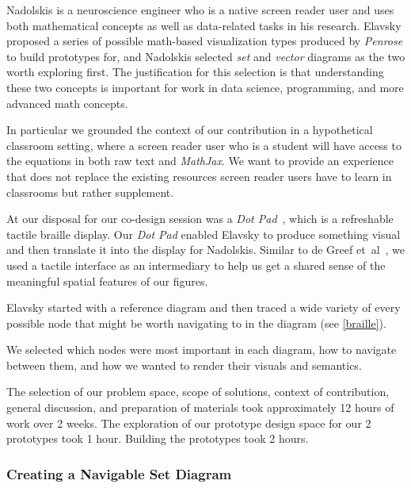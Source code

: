 \documentclass[journal]{vgtc}                %
\newcommand{\ea}{{et~al\xperiod}\xspace}
\begin{document}
Nadolskis is a neuroscience engineer who is a native screen reader user and uses both mathematical concepts as well as data-related tasks in his research. Elavsky proposed a series of possible math-based visualization types produced by \textit{Penrose} to build prototypes for, and Nadolskis selected \textit{set} and \textit{vector} diagrams as the two worth exploring first. The justification for this selection is that understanding these two concepts is important for work in data science, programming, and more advanced math concepts.

In particular we grounded the context of our contribution in a hypothetical classroom setting, where a screen reader user who is a student will have access to the equations in both raw text and \textit{MathJax}. We want to provide an experience that does not replace the existing resources screen reader users have to learn in classrooms but rather supplement.

At our disposal for our co-design session was a \textit{Dot Pad}~\cite{Dot2020Dot}, which is a refreshable tactile braille display. Our \textit{Dot Pad} enabled Elavsky to produce something visual and then translate it into the display for Nadolskis. Similar to de Greef \ea~\cite{deGreef2021Interdependent}, we used a tactile interface as an intermediary to help us get a shared sense of the meaningful spatial features of our figures.

Elavsky started with a reference diagram and then traced a wide variety of every possible node that might be worth navigating to in the diagram (see \autoref{braille}).

We selected which nodes were most important in each diagram, how to navigate between them, and how we wanted to render their visuals and semantics.

The selection of our problem space, scope of solutions, context of contribution, general discussion, and preparation of materials took approximately 12 hours of work over 2 weeks. The exploration of our prototype design space for our 2 prototypes took 1 hour. Building the prototypes took 2 hours.

\subsubsection{Creating a Navigable Set Diagram}
\end{document}
